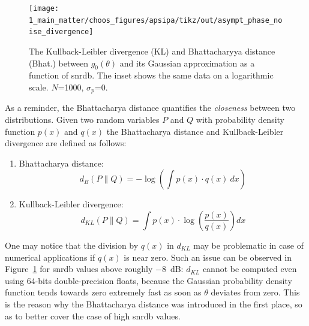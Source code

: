 \begin{figure}
	\centering
	\texttt{[image: 1\_main\_matter/choos\_figures/apsipa/tikz/out/asympt\_phase\_noise\_divergence]}
	\caption[The Kullback-Leibler divergence and Bhattacharyya distance between $g_0(\theta)$ and its Gaussian approximation as a function of \gls{snrdb}.]{The Kullback-Leibler divergence (KL) and Bhattacharyya distance (Bhat.) between $g_0(\theta)$ and its Gaussian approximation as a function of \gls{snrdb}. The inset shows the same data on a logarithmic scale. $N$=1000, $\sigma_p$=0.}
	\label{fig:choos:apsipa:asympt_linear_divergence}
\end{figure}

As a reminder, the Bhattacharya distance quantifies the \emph{closeness} between two distributions. Given two random variables $P$ and $Q$ with probability density function $p(x)$ and $q(x)$ the Bhattacharya distance and Kullback-Leibler divergence are defined as follows\cite{kailath1967}:

\begin{enumerate}[label=\textit{(\roman*)}]
	\item Bhattacharya distance:
	\begin{equation}
		d_{B}(P \| Q) = - \log \left(\int p(x) \cdot q(x) \ dx\right)
	\end{equation}
	\item Kullback-Leibler divergence:
	\begin{equation}
		d_{KL}(P \| Q) = \int p(x) \cdot \log \left(\frac{p(x)}{q(x)}\right) dx
	\end{equation}
\end{enumerate}

One may notice that the division by $q(x)$ in $d_{KL}$ may be problematic in case of numerical applications if $q(x)$ is near zero. Such an issue can be observed in Figure~\ref{fig:choos:apsipa:asympt_linear_divergence} for \gls{snrdb} values above roughly $-8$~dB: $d_{KL}$ cannot be computed even using 64-bits double-precision floats, because the Gaussian probability density function tends towards zero extremely fast as soon as $\theta$ deviates from zero. This is the reason why the Bhattacharya distance was introduced in the first place, so as to better cover the case of high \gls{snrdb} values.

